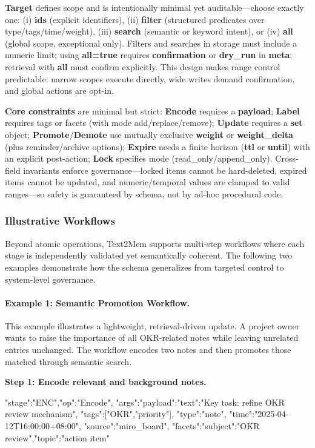 \documentclass[conference]{IEEEtran}
\begin{document}
\textbf{Target} defines scope and is intentionally minimal yet auditable—choose exactly one: (i) \textbf{ids} (explicit identifiers), (ii) \textbf{filter} (structured predicates over type/tags/time/weight), (iii) \textbf{search} (semantic or keyword intent), or (iv) \textbf{all} (global scope, exceptional only).  
Filters and searches in storage must include a numeric limit; using \textbf{all=true} requires \textbf{confirmation} or \textbf{dry\_run} in \textbf{meta}; retrieval with \textbf{all} must confirm explicitly.  
This design makes range control predictable: narrow scopes execute directly, wide writes demand confirmation, and global actions are opt-in.

\textbf{Core constraints} are minimal but strict: \textbf{Encode} requires a \textbf{payload}; \textbf{Label} requires tags or facets (with mode add/replace/remove); \textbf{Update} requires a \textbf{set} object; \textbf{Promote}/\textbf{Demote} use mutually exclusive \textbf{weight} or \textbf{weight\_delta} (plus reminder/archive options); \textbf{Expire} needs a finite horizon (\textbf{ttl} or \textbf{until}) with an explicit post-action; \textbf{Lock} specifies mode (read\_only/append\_only).  
Cross-field invariants enforce governance—locked items cannot be hard-deleted, expired items cannot be updated, and numeric/temporal values are clamped to valid ranges—so safety is guaranteed by schema, not by ad-hoc procedural code.

\subsubsection{\textbf{Illustrative Workflows}}

Beyond atomic operations, Text2Mem supports multi-step workflows where each stage is independently validated yet semantically coherent.  
The following two examples demonstrate how the schema generalizes from targeted control to system-level governance.

\paragraph{Example 1: Semantic Promotion Workflow.}
This example illustrates a lightweight, retrieval-driven update.  
A project owner wants to raise the importance of all OKR-related notes while leaving unrelated entries unchanged.  
The workflow encodes two notes and then promotes those matched through semantic search.

\textbf{Step 1: Encode relevant and background notes.}
\begin{jsonbox}
{"stage":"ENC","op":"Encode",
 "args":{"payload":{"text":"Key task: refine OKR review mechanism"},
         "tags":["OKR","priority"],
         "type":"note",
         "time":"2025-04-12T16:00:00+08:00",
         "source":"miro_board",
         "facets":{"subject":"OKR review","topic":"action item"}}}
\end{jsonbox}
\end{document}
